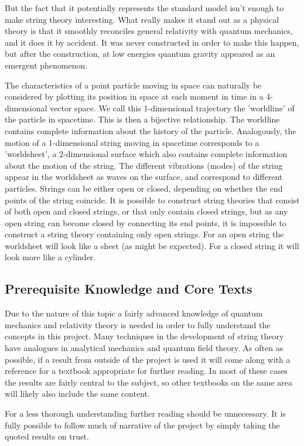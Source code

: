 \documentclass[a4paper,12pt]{article}
\numberwithin{equation}{section}
\begin{document}
But the fact that it potentially represents the standard model isn’t enough to make string theory interesting. What really makes it stand out as a physical theory is that it smoothly reconciles general relativity with quantum mechanics, and it does it by accident. It was never constructed in order to make this happen, but after the construction, at low energies quantum gravity appeared as an emergent phenomenon.

The characteristics of a point particle moving in space can naturally be considered by plotting its position in space at each moment in time in a 4-dimensional vector space. We call this 1-dimensional trajectory the ’worldline’ of the particle in spacetime. This is then a bijective relationship. The worldline contains complete information about the history of the particle. Analogously, the motion of a 1-dimensional string moving in spacetime corresponds to a ’worldsheet’, a 2-dimensional surface which also contains complete information about the motion of the string. The different vibrations (modes) of the string appear in the worldsheet as waves on the surface, and correspond to different particles.
Strings can be either open or closed, depending on whether the end points of the string coincide. It is possible to construct string theories that consist of both open and closed strings, or that only contain closed strings, but as any open string can become closed by connecting its end points, it is impossible to construct a string theory containing only open strings. For an open string the worldsheet will look like a sheet (as might be expected). For a closed string it will look more like a cylinder.
\subsection{Prerequisite Knowledge and Core Texts}
Due to the nature of this topic a fairly advanced knowledge of quantum mechanics and relativity theory is needed in order to fully understand the concepts in this project. Many techniques in the development of string theory have analogues in analytical mechanics and quantum field theory. As often as possible, if a result from outside of the project is used it will come along with a reference for a textbook appropriate for further reading. In most of these cases the results are fairly central to the subject, so other textbooks on the same area will likely also include the same content.

For a less thorough understanding further reading should be unnecessary. It is fully possible to follow much of narrative of the project by simply taking the quoted results on trust. 
\end{document}
